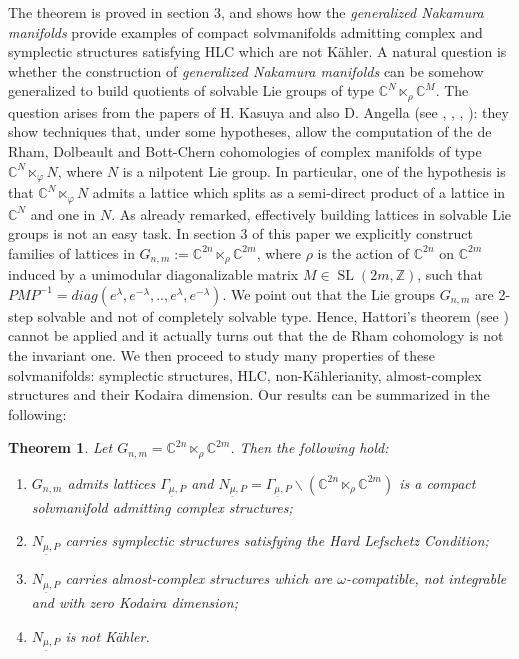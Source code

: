 \documentclass[a4paper, 11pt]{amsart}
\theoremstyle{plain}
\newtheorem{teorema}{Theorem} [section]
\theoremstyle{definition}
\DeclareMathOperator{\SL}{SL}
\newcommand{\C}{\mathbb{C}}
\numberwithin{equation}{section}
\begin{document}
{The theorem is proved in section 3, and shows how the \textit{generalized Nakamura manifolds} provide examples of compact solvmanifolds admitting complex and symplectic structures satisfying HLC which are not K\"ahler. A natural question is whether the construction of \textit{generalized Nakamura manifolds} can be somehow generalized to build quotients of solvable Lie groups of type $\C^{N} \ltimes_{\rho} \C^{M}$. The question arises from the papers of H. Kasuya and also D. Angella (see \cite{AK}, \cite{Kasuya}, \cite{Kasuya2}, \cite{Kasuya3}): they show techniques that, under some hypotheses, allow the computation of the de Rham, Dolbeault and Bott-Chern cohomologies of complex manifolds of type $\C^{N} \ltimes_{\varphi} N$, where $N$ is a nilpotent Lie group. In particular, one of the hypothesis is that $\C^{N} \ltimes_{\varphi} N$ admits a lattice which splits as a semi-direct product of a lattice in $\C^{N}$ and one in $N$. As already remarked, effectively building lattices in solvable Lie groups is not an easy task. In section 3 of this paper we explicitly construct families of lattices in $G_{n,m} := \C^{2n} \ltimes_{\rho} \C^{2m}$, where $\rho$ is the action of $\C^{2n}$ on $\C^{2m}$ induced by a unimodular diagonalizable matrix $M \in \SL(2m,\mathbb{Z})$, such that $PMP^{-1} = diag(e^{\lambda}, e^{-\lambda}, ..,e^{\lambda}, e^{-\lambda} )$. We point out that the Lie groups $G_{n,m}$ are 2-step solvable and not of completely solvable type. Hence, Hattori's theorem (see \cite{Hattori}) cannot be applied and it actually turns out that the de Rham cohomology is not the invariant one. We then proceed to study many properties of these solvmanifolds: symplectic structures, HLC, non-K\"ahlerianity, almost-complex structures and their Kodaira dimension.  Our results can be summarized in the following:

\begin{teorema}\label{MainThm2}
    Let $G_{n,m} = \C^{2n} \ltimes_{\rho} \C^{2m}$. Then the following hold:
    \begin{enumerate}
        \item $G_{n,m}$ admits lattices $\Gamma_{\underline{\mu},P}$ and $N_{\underline{\mu},P} = \Gamma_{\underline{\mu},P} \backslash (\C^{2n} \ltimes_{\rho} \C^{2m})$ is a compact solvmanifold admitting complex structures;
        \item $N_{\underline{\mu},P}$ carries symplectic structures satisfying the \textit{Hard Lefschetz Condition};
        \item $N_{\underline{\mu},P}$ carries almost-complex structures which are $\omega$-compatible, not integrable and with zero Kodaira dimension;
        \item $N_{\underline{\mu},P}$ is not K\"ahler.
    \end{enumerate}
\end{teorema}

}
\end{document}
